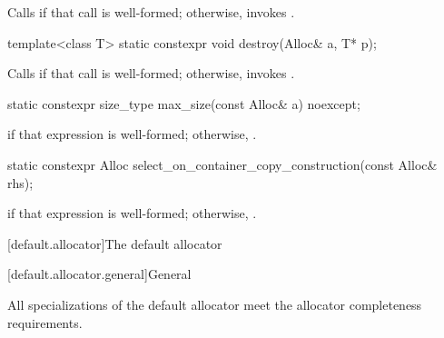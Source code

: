 \begin{itemdescr}
\pnum
\effects
Calls 
if that call is well-formed;
otherwise, invokes .
\end{itemdescr}

%
\begin{itemdecl}
template<class T>
  static constexpr void destroy(Alloc& a, T* p);
\end{itemdecl}

\begin{itemdescr}
\pnum
\effects
Calls  if that call is well-formed; otherwise, invokes
.
\end{itemdescr}

%
\begin{itemdecl}
static constexpr size_type max_size(const Alloc& a) noexcept;
\end{itemdecl}

\begin{itemdescr}
\pnum
\returns
{} if that expression is well-formed; otherwise,
.
\end{itemdescr}

%
\begin{itemdecl}
static constexpr Alloc select_on_container_copy_construction(const Alloc& rhs);
\end{itemdecl}

\begin{itemdescr}
\pnum
\returns
{} if that expression is
well-formed; otherwise, .
\end{itemdescr}

[default.allocator]{The default allocator}

[default.allocator.general]{General}

\pnum
All specializations of the default allocator meet the
allocator completeness requirements.

